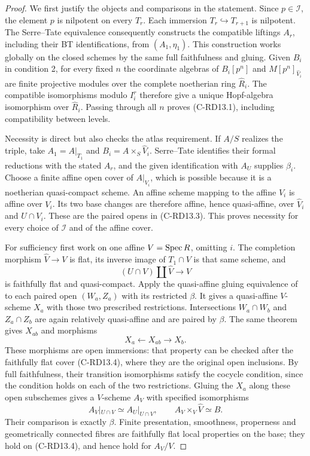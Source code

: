 \begin{proof}
We first justify the objects and comparisons in the statement.
Since $p\in\mathcal I$, the element $p$ is nilpotent on every $T_r$.
Each immersion $T_r\hookrightarrow T_{r+1}$ is nilpotent. The
Serre--Tate equivalence
\cite[Theorem~1.2.1]{Katz1981SerreTate} consequently constructs the
compatible liftings $A_r$, including their BT identifications, from
$(A_1,\eta_1)$. This construction works globally on the closed
schemes by the same full faithfulness and gluing. Given $B_i$ in
condition 2, for every fixed $n$ the coordinate algebras of
$B_i[p^n]$ and $M[p^n]_{\widehat V_i}$ are finite projective modules
over the complete noetherian ring $\widehat R_i$. The compatible
isomorphisms modulo $I_i^r$ therefore give a unique Hopf-algebra
isomorphism over $\widehat R_i$. Passing through all $n$ proves
(C-RD13.1), including compatibility between levels.

Necessity is direct but also checks the atlas requirement. If $A/S$
realizes the triple, take $A_1=A|_{T_1}$ and
$B_i=A\times_S\widehat V_i$. Serre--Tate identifies their formal
reductions with the stated $A_r$, and the given identification with
$A_U$ supplies $\beta_i$. Choose a finite affine open cover of
$A|_{V_i}$, which is possible because it is a noetherian
quasi-compact scheme. An affine scheme mapping to the affine $V_i$
is affine over $V_i$. Its two base changes are therefore affine,
hence quasi-affine, over $\widehat V_i$ and $U\cap V_i$. These are
the paired opens in (C-RD13.3). This proves necessity for every
choice of $\mathcal I$ and of the affine cover.

For sufficiency first work on one affine $V=\operatorname{Spec} R$, omitting $i$.
The completion morphism $\widehat V\to V$ is flat, its inverse image
of $T_1\cap V$ is that same scheme, and
\[
             (U\cap V)\amalg\widehat V\longrightarrow V
                                                        \tag{C-RD13.4}
\]
is faithfully flat and quasi-compact. Apply the quasi-affine gluing
equivalence of \cite[Theorem~1.1, p.565]{MoretBailly1996Descent}
to each paired open $(W_a,Z_a)$ with its restricted $\beta$.
It gives a quasi-affine $V$-scheme $X_a$ with those two prescribed
restrictions. Intersections $W_a\cap W_b$ and $Z_a\cap Z_b$ are
again relatively quasi-affine and are paired by $\beta$. The same
theorem gives $X_{ab}$ and morphisms
\[
                         X_a\longleftarrow X_{ab}\longrightarrow X_b.
\]
These morphisms are open immersions: that property can be checked
after the faithfully flat cover (C-RD13.4), where they are the
original open inclusions. By full faithfulness, their transition
isomorphisms satisfy the cocycle condition, since the condition
holds on each of the two restrictions. Gluing the $X_a$ along these
open subschemes gives a $V$-scheme $A_V$ with specified isomorphisms
\[
 A_V|_{U\cap V}\simeq A_U|_{U\cap V},\qquad
 A_V\times_V\widehat V\simeq B.
                                                        \tag{C-RD13.5}
\]
Their comparison is exactly $\beta$. Finite presentation, smoothness,
properness and geometrically connected fibres are faithfully flat
local properties on the base; they hold on (C-RD13.4), and hence
hold for $A_V/V$.


\end{proof}
